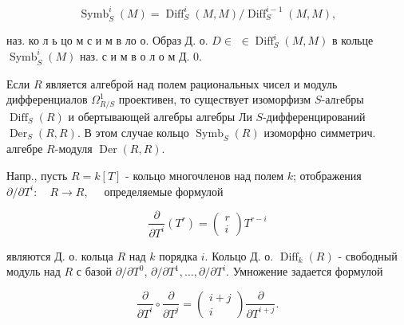 \documentclass[10pt]{article}
\begin{document}
\[

\operatorname{Symb}_{S}^{i}(M)=\operatorname{Diff}_{S}^{i}(M, M) / \operatorname{Diff}_{S}^{i-1}(M, M),

\]



наз. ко л ь цо м с и м в ло о. Образ Д. о. $D \in$ $\in \operatorname{Diff}_{S}^{i}(M, M)$ в кольце $\operatorname{Symb}_{S}^{i}(M)$ наз. с и м в о л о м Д. 0.



Если $R$ является алгеброй над полем рациональных чисел и модуль дифференциалов $\Omega_{R / S}^{1}$ проективен, то существует изоморфизм $S$-алrебры $\operatorname{Diff}_{S}(R)$ и обертывающей алгебры алгебры Ли $S$-дифференцирований $\operatorname{Der}_{S}(R, R)$. В этом случае кольцо $\operatorname{Symb}_{S}(R)$ изоморфно симметрич. алгебре $R$-модуля $\operatorname{Der}(R, R)$.



Напр., пусть $R=k[T]$ - кольцо многочленов над полем $k$; отображения $\partial / \partial T^{i}: \quad R \rightarrow R, \quad$ определяемые формулой



\[

\frac{\partial}{\partial T^{i}}\left(T^{r}\right)=\left(\begin{array}{c}

r \\

i

\end{array}\right) T^{r-i}

\]



являются Д. о. кольца $R$ над $k$ порядка $i$. Кольцо Д. о. $\operatorname{Diff}_{k}(R)$ - свободный модуль над $R$ с базой $\partial / \partial T^{0}$, $\partial / \partial T^{1}, \ldots, \partial / \partial T^{i}$. Умножение задается формулой



\[

\frac{\partial}{\partial T^{i}} \circ \frac{\partial}{\partial T^{j}}=\left(\begin{array}{c}

i+j \\

i

\end{array}\right) \frac{\partial}{\partial T^{i+j}} .

\]
\end{document}

